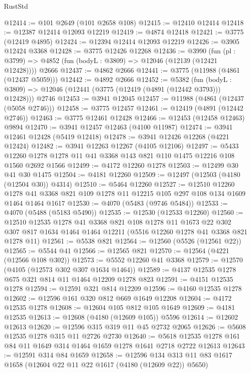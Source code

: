 \begin{lexlean}{RustStd}
\begin{coremodule}
@12414 := @101 @2649 (@101 @2658 @108)
@12415 := @12410 @12414
@12418 := @12387 @12414 @12093 @12219
@12419 := @4874 @12418
@12421 := @3775 (@12419 @4895)
@12424 := @12394 @12414 @12093 @12219
@12426 := @3905 @12424 @3368
@12428 := @3775 @12426 @12268
@12436 := @3990
    (fun (pl : @3799) => @4852 (fun (bodyL : @3809) => @12046 (@12139 (@12421 @12428))))
    @2666
@12437 := @4862 @2666
@12441 := @3775 (@11988 (@4861 (@12437 @5059)))
@12442 := @4892 @2666
@12452 := @5382
    (fun (bodyL : @3809) => @12046 (@12441 (@3775 (@12419 (@4891 (@12442 @3793))) @12428)))
    @2746
@12453 := @3941 @12045
@12457 := @11988 (@4861 (@12437 (@5058 @2746)))
@12458 := @3775 @12457
@12461 := @12419 (@4891 (@12442 @2746))
@12463 := @3775 @12461 @12428
@12466 := @12453 (@12458 @12463) @9894
@12470 := @3941 @12457 @12463 (@4100 @11987)
@12474 := @3941 @12461 @12428 (@5419 @12418)
@12478 := @3941 @12426 @12268 (@4221 @12424)
@12482 := @3941 @12263 @12267 (@4105 @12106)
@12497 := @5433 @12260 @1278 @1278 @11 @41 @3368 @143 @821 @110 @1475 @12216 @108 @1560 @2692 @1566
@12499 := @4172 @12260 @1278
@12503 := @12499 @30 @41 @30 @1475
@12504 := @4181 @12260
@12509 := @12497 (@12503 (@4180 (@12504 @30)) @4314)
@12510 := @5464 @12260
@12527 := @12510
    @12260
    @1278
    @41
    @3368
    @821
    @109
    @1278
    @11
    @12215
    @105
    @297
    @108
    @134
    @1609
    @1464
    @1464
    @1617
@12530 := @4070 (@5483 (@9746 @5484))
@12533 := @4070 (@5488 (@5183 @5490))
@12535 := @12530 (@12533 @12260)
@12560 := @12510
    @12535
    @1278
    @41
    @3368
    @821
    @108
    @1278
    @11
    @1673
    @22
    @302
    @307
    @817
    @1634
    @1464
    @1464
    @12211
    (@5516 @12260 @1278 @41 @3368 @821 @1278 @11)
@12561 := @5538 @821
@12564 := @12560 (@5526 (@12561 @22))
@12565 := @5544 @41
@12566 := @12565 @821
@12570 := @12564 (@4221 (@12566 @108 @302))
@12573 := @5552 @12260 @41 @3368
@12579 := @12570 (@4105 (@12573 @302 @307 @1634 @1464))
@12589 := @4137 @12535 @1278 @675 @321 @814 @11 @1464 @12209 @1278 @823
@12591 := @4151 @12535 @1278
@12594 := @12591 @321 @814 @12209
@12596 := @4160 @12535 @1278
@12602 := @12596 @161 @320 @812 @669 @1649 @12208
@12604 := @4172 @12535 @1278
@12608 := @12604 @105 @812 @105 @1649
@12609 := @4181 @12535
@12613 := @12608 (@4180 (@12609 @105)) @5596
@12614 := @12602 @12613
@12620 := @12596 @315 @319 @11 @45 @2732 @2065
@12626 := @5608 @12535 @1278 @315 @11 @2726 @2730
@12640 := @5618 @12535 @1278 @161 @84 @11 @1649 @314 @1464 @1659 @1278 @1641 @2718 @2722 @12613
@12643 := @12591 @314 @84 @1659
@12658 := @12596 @134 @313 @11 @83 @1617 @1658 (@12604 @22 @11 @22 @1617 (@4180 (@12609 @22)) @5650)

\end{coremodule}
\end{lexlean}
